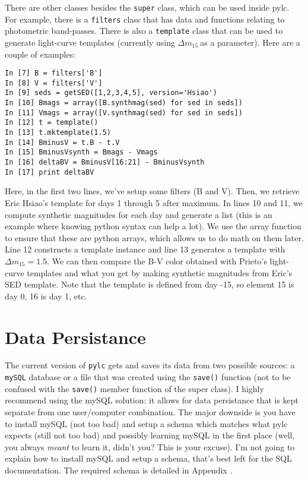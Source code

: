 \documentclass[12pt]{article}
\newcommand{\dmf}{$\Delta m_{15}\ $}
\begin{document}
There are other classes besides the \texttt{super} class, which can
be used inside pylc. For example, there is a \texttt{filters} class
that has data and functions relating to photometric band-passes. There
is also a \texttt{template} class that can be used to generate light-curve
templates (currently using \dmf as a parameter). Here are a couple
of examples:

\begin{verbatim}
In [7] B = filters['B']
In [8] V = filters['V']
In [9] seds = getSED([1,2,3,4,5], version='Hsiao') 
In [10] Bmags = array([B.synthmag(sed) for sed in seds]) 
In [11] Vmags = array([V.synthmag(sed) for sed in seds]) 
In [12] t = template() 
In [13] t.mktemplate(1.5) 
In [14] BminusV = t.B - t.V
In [15] BminusVsynth = Bmags - Vmags
In [16] deltaBV = BminusV[16:21] - BminusVsynth
In [17] print deltaBV 
\end{verbatim}

Here, in the first two lines, we've setup some filters (B and V).
Then, we retrieve Eric Hsiao's template for days 1 through 5 after
maximum. In lines 10 and 11, we compute synthetic magnitudes for each
day and generate a list (this is an example where knowing python syntax
can help a lot). We use the array function to ensure that these are
python arrays, which allows us to do math on them later. Line 12 constructs
a template instance and line 13 generates a template with $\Delta m_{15}=1.5$.
We can then compare the B-V color obtained with Prieto's light-curve
templates and what you get by making synthetic magnitudes from Eric's
SED template. Note that the template is defined from day -15, so element
15 is day 0, 16 is day 1, etc.


\section{Data Persistance}

The current version of \texttt{pylc} gets and saves its data from
two possible sources: a \texttt{mySQL} database or a file that was
created using the \texttt{save()} function (not to be confused with
the \texttt{save()} member function of the super class). I highly
recommend using the mySQL solution: it allows for data persistance
that is kept separate from one user/computer combination. The major
downside is you have to install mySQL (not too bad) and setup a schema
which matches what pylc expects (still not too bad) and possibly learning
mySQL in the first place (well, you always \emph{meant} to learn it,
didn't you? This is your excuse). I'm not going to explain how to
install mySQL and setup a schema, that's best left for the SQL documentation.
The required schema is detailed in Appendix .
\end{document}
